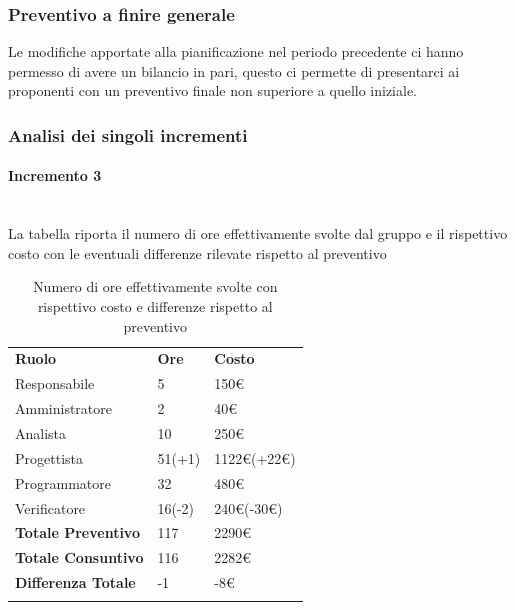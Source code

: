 \subsubsection{Preventivo a finire generale}
Le modifiche apportate alla pianificazione nel periodo precedente ci hanno permesso di avere un bilancio in pari, questo ci permette di presentarci ai proponenti con un preventivo finale non superiore a quello iniziale.

\subsubsection{Analisi dei singoli incrementi}
\paragraph*{Incremento 3} \mbox{} \\
La tabella riporta il numero di ore effettivamente svolte dal gruppo e il rispettivo costo con le eventuali differenze rilevate rispetto al preventivo
\begin{longtable} {							
		>{}p{40mm}  
		>{}p{20mm}	
		>{}p{28mm}			
	}			
	\rowcolor{gray!50}
	
	\textbf{Ruolo}            & \textbf{Ore} & \textbf{Costo}       \TBstrut \\
	Responsabile              & 5            & 150\euro             \TBstrut \\
	Amministratore            & 2            & 40\euro              \TBstrut \\
	Analista                  & 10           & 250\euro             \TBstrut \\
	Progettista               & 51(+1)       & 1122\euro(+22\euro)  \TBstrut \\
	Programmatore             & 32           & 480\euro             \TBstrut \\
	Verificatore              & 16(-2)       & 240\euro(-30\euro)   \TBstrut \\
	\textbf{Totale Preventivo}& 117          & 2290\euro            \TBstrut \\	
	\textbf{Totale Consuntivo}& 116          & 2282\euro            \TBstrut \\	
	\textbf{Differenza Totale}& -1           & -8\euro              \TBstrut \\
	\rowcolor{white}
	\caption{Numero di ore effettivamente svolte con rispettivo costo e differenze rispetto al preventivo}	
\end{longtable}

